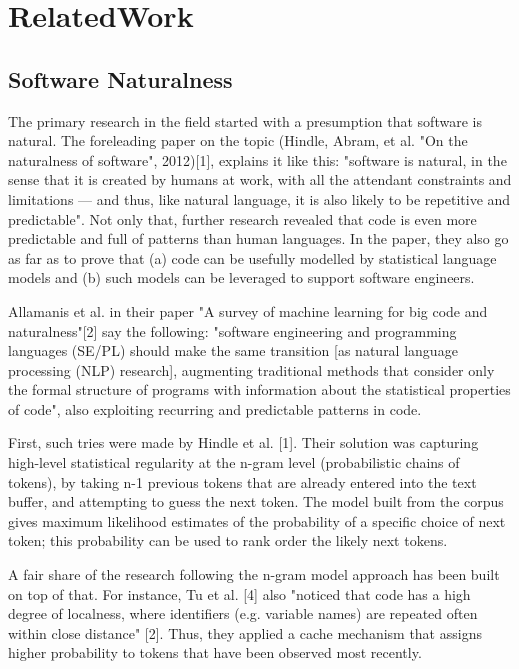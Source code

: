 \chapter{RelatedWork}
\label{chap:RelatedWork}

\section{Software Naturalness}
The primary research in the field started with a presumption that software is natural.
The foreleading paper on the topic (Hindle, Abram, et al. "On the naturalness of software", 2012)[1],
explains it like this: "software is natural, in the sense that it is created by humans at work,
with all the attendant constraints and limitations — and thus, like natural language, it is also
likely to be repetitive and predictable". Not only that, further research revealed that code is
even more predictable and full of patterns than human languages. In the paper, they also go as far
as to prove that (a) code can be usefully modelled by statistical language models and (b) such models
can be leveraged to support software engineers.

Allamanis et al. in their paper "A survey of machine learning for big code and naturalness"[2]
say the following: "software engineering and programming languages (SE/PL) should make the same
transition [as natural language processing (NLP) research], augmenting traditional methods that
consider only the formal structure of programs with information about the statistical properties
of code", also exploiting recurring and predictable patterns in code.

First, such tries were made by Hindle et al. [1]. Their solution was capturing high-level statistical
regularity at the n-gram level (probabilistic chains of tokens), by taking n-1 previous tokens that
are already entered into the text buffer, and attempting to guess the next token. The model built
from the corpus gives maximum likelihood estimates of the probability of a specific choice of next token;
this probability can be used to rank order the likely next tokens.

A fair share of the research following the n-gram model approach has been built on top of that.
For instance, Tu et al. [4] also "noticed that code has a high degree of localness, where identifiers
(e.g. variable names) are repeated often within close distance" [2]. Thus, they applied a cache mechanism
that assigns higher probability to tokens that have been observed most recently.

